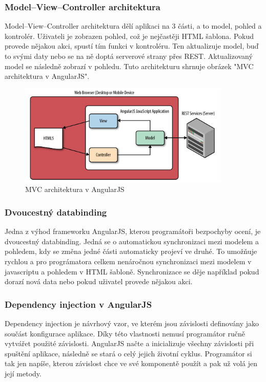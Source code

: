 \documentclass[czech,master,public,dept460,male,cpdeclaration,twoside]{diploma}
\begin{document}
\subsubsection{Model–View–Controller architektura}
Model–View–Controller architektura dělí aplikaci na 3 části, a to model, pohled a kontrolér. Uživateli je zobrazen pohled, což je nejčastěji HTML šablona. Pokud provede nějakou akci, spustí tím funkci v kontroléru. Ten aktualizuje model, buď to svými daty nebo se na ně doptá serverové strany přes REST. Aktualizovaný model se následně zobrazí v pohledu. Tuto architekturu shrnuje obrázek "MVC architektura v AngularJS".
\begin{figure}[H]
\centering\includegraphics[width=0.9\textwidth]{Figures/MVC.png}\caption{MVC architektura v AngularJS \cite{LearningAngularjs}}
\end{figure}

\subsubsection{Dvoucestný databinding}
Jedna z výhod frameworku AngularJS, kterou programátoři bezpochyby ocení, je dvoucestný databinding. Jedná se o automatickou synchronizaci mezi modelem a pohledem, kdy se změna jedné části automaticky projeví ve druhé. To umožňuje rychlou a pro prográmatora celkem nenáročnou synchronizaci mezi modelem v javascriptu a pohledem v HTML šabloně. Synchronizace se děje například pokud dorazí nová data nebo pokud uživatel provede nějakou akci. \cite{databinding}

\subsubsection{Dependency injection v AngularJS}
Dependency injection je návrhový vzor, ve kterém jsou závislosti definovány jako součást konfigurace aplikace. Díky této vlastnosti nemusí programátor ručně vytvářet použité závislosti. AngularJS načte a inicializuje všechny závislosti při spuštění aplikace, následně se stará o celý jejich životní cyklus. Programátor si tak jen napíše, kterou závislost chce ve své komponentě použít a pak už volá jen její metody.
\end{document}
